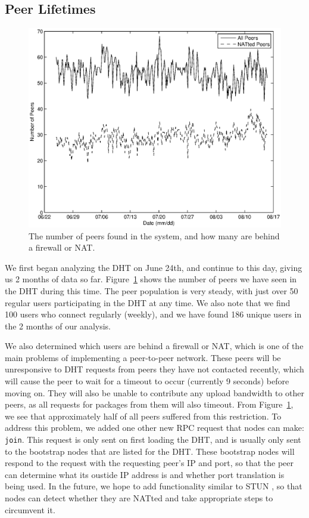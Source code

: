 \documentclass[conference]{IEEEtran}
\begin{document}
\subsection{Peer Lifetimes}
\label{peer_life}

\begin{figure}
\centering
\includegraphics[width=\columnwidth]{AptP2PWalker-peers.eps}
\caption{The number of peers found in the system, and how many are
behind a firewall or NAT.}
\label{walker_peers}
\end{figure}

We first began analyzing the DHT on June 24th, and continue to this
day, giving us 2 months of data so far. Figure~\ref{walker_peers}
shows the number of peers we have seen in the DHT during this time.
The peer population is very steady, with just over 50 regular users
participating in the DHT at any time. We also note that we find 100
users who connect regularly (weekly), and we have found 186 unique
users in the 2 months of our analysis.

We also determined which users are
behind a firewall or NAT, which is one of the main problems of
implementing a peer-to-peer network. These peers will be
unresponsive to DHT requests from peers they have not contacted
recently, which will cause the peer to wait for a timeout to occur
(currently 9 seconds) before moving on. They will also be
unable to contribute any upload bandwidth to other peers, as all
requests for packages from them will also timeout. From
Figure~\ref{walker_peers}, we see that approximately half of all
peers suffered from this restriction. To address this problem, we added one other new RPC request that nodes can make:
\texttt{join}. This request is only sent on first loading the DHT,
and is usually only sent to the bootstrap nodes that are listed for
the DHT. These bootstrap nodes will respond to the request with the
requesting peer's IP and port, so that the peer can determine what
its oustide IP address is and whether port translation is being
used. In the future, we hope to add functionality similar to STUN
\cite{STUN}, so that nodes can detect whether they are NATted and
take appropriate steps to circumvent it.
\end{document}
